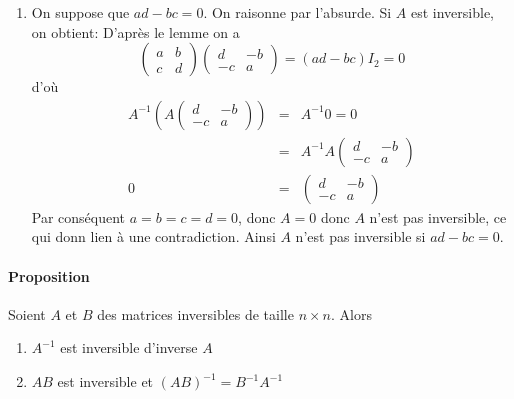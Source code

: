 {\begin{enumerate}
    \item On suppose que $a d - b c = 0$. On raisonne par l'absurde. Si $A$ est inversible, on obtient: D'après le lemme on a
      $$\begin{pmatrix} a & b \\ c & d \end{pmatrix} \begin{pmatrix} d & -b \\ -c & a \end{pmatrix} = (a d - b c) I_2 = 0$$
      d'où
      \begin{eqnarray*}
        A^{-1} \left( A \begin{pmatrix} d & -b \\ -c & a \end{pmatrix} \right) &=& A^{-1} 0 = 0 \\
          &=& A^{-1} A \begin{pmatrix} d & -b \\ -c & a \end{pmatrix} \\
        0 &=& \begin{pmatrix} d & -b \\ -c & a \end{pmatrix}
      \end{eqnarray*}
      Par conséquent $a = b = c = d = 0$, donc $A = 0$ donc $A$ n'est pas inversible, ce qui donn lien à une contradiction. Ainsi $A$ n'est pas inversible si $a d - b c = 0$.
      
  \end{enumerate}
}

\paragraph{Proposition} Soient $A$ et $B$ des matrices inversibles de taille $n \times n$. Alors
\begin{enumerate}
  \item $A^{-1}$ est inversible d'inverse $A$
  \item $A B$ est inversible et $(A B)^{-1} = B^{-1} A^{-1}$
\end{enumerate}


